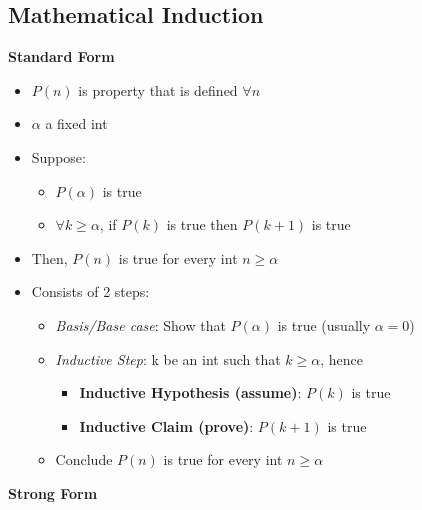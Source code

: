\documentclass[10pt, 
a4paper, 
oneside, 
headinclude, footinclude, 
BCOR5mm]
{scrartcl}
\begin{document}
\subsection{Mathematical Induction}
\textbf{Standard Form}
\begin{itemize}
    \item $P(n)$ is property that is defined $\forall n$
    \item $\alpha$ a fixed int
    \item Suppose:
    \begin{itemize}
        \item $P(\alpha)$ is true
        \item $\forall k \geq \alpha$, if $P(k)$ is true then $P(k + 1)$ is true
    \end{itemize}
    \item Then, $P(n)$ is true for every int $n \geq \alpha$
    \item Consists of 2 steps:
    \begin{itemize}
        \item \textit{Basis/Base case}: Show that $P(\alpha)$ is true (usually $\alpha = 0$)
        \item \textit{Inductive Step}: k be an int such that $k \geq \alpha$, hence
        \begin{itemize}
            \item \textbf{Inductive Hypothesis (assume)}: $P(k)$ is true
            \item \textbf{Inductive Claim (prove)}: $P(k + 1)$ is true
        \end{itemize}
        \item Conclude $P(n)$ is true for every int $n \geq \alpha$
    \end{itemize}
\end{itemize}
\textbf{Strong Form}
\end{document}

